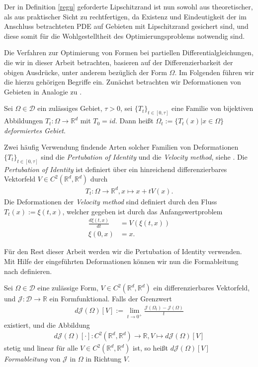 Der in Definition \ref{regu} geforderte Lipschitzrand ist nun sowohl aus theoretischer, als aus praktischer Sicht zu rechtfertigen, da Existenz und Eindeutigkeit der im Anschluss betrachteten PDE auf Gebieten mit Lipschitzrand gesichert sind, und diese somit für die Wohlgestelltheit des Optimierungsproblems notwendig sind. 

Die Verfahren zur Optimierung von Formen bei partiellen Differentialgleichungen, die wir in dieser Arbeit betrachten, basieren auf der Differenzierbarkeit der obigen Ausdrücke, unter anderem bezüglich der Form $\Omega$. Im Folgenden führen wir die hierzu gehörigen Begriffe ein. Zunächst betrachten wir Deformationen von Gebieten in Analogie zu \cite{bfgs2}.

\begin{defi}
Sei $\Omega\in\mathcal{D}$ ein zulässiges Gebiet, $\tau > 0$, sei $\{T_t\}_{t\in [0,\tau]}$ eine Familie von bijektiven Abbildungen $T_t: \Omega \rightarrow \mathbb{R}^d$ mit $T_0 = id$. Dann heißt $\Omega_t := \{T_t(x) \vert x\in\Omega\}$ \textit{deformiertes Gebiet}.
\end{defi}

Zwei häufig Verwendung findende Arten solcher Familien von Deformationen $\{T_t\}_{t\in [0,\tau]}$ sind die \textit{Pertubation of Identity} und die \textit{Velocity method}, siehe \cite{bfgs2}. Die \textit{Pertubation of Identity} ist definiert über ein hinreichend differenzierbares Vektorfeld $V \in C^2(\mathbb{R}^d,\mathbb{R}^d)$ durch
\begin{align*}
	T_t: \Omega \rightarrow \mathbb{R}^d, x \mapsto x + tV(x).
\end{align*}
Die Deformationen der \textit{Velocity method} sind definiert durch den Fluss $T_t(x) := \xi(t,x)$, welcher gegeben ist durch das Anfangswertproblem
\begin{align*}
	\frac{d\xi(t,x)}{dt} &= V(\xi(t,x))\\
	\xi(0,x) 		&= x.
\end{align*}

Für den Rest dieser Arbeit werden wir die Pertubation of Identity verwenden. Mit Hilfe der eingeführten Deformationen können wir nun die Formableitung nach \cite{bfgs2} definieren. 

\begin{defi}[Formableitung]
Sei $\Omega \in \mathcal{D}$ eine zulässige Form, $V\in C^2(\mathbb{R}^d,\mathbb{R}^d)$ ein differenzierbares Vektorfeld, und $\mathcal{J}: \mathcal{D} \rightarrow \mathbb{R}$ ein Formfunktional. Falls der Grenzwert
\begin{align*}
	d\mathcal{J}(\Omega)[V] := \underset{t \rightarrow 0^+}{\lim}
	\frac{\mathcal{J}(\Omega_t) - \mathcal{J}(\Omega)}{t}
\end{align*}
existiert, und die Abbildung 
\begin{align*}
	d\mathcal{J}(\Omega)[\cdot]: C^2(\mathbb{R}^d,\mathbb{R}^d) \rightarrow 						\mathbb{R}, V \mapsto d\mathcal{J}(\Omega)[V]
\end{align*}
stetig und linear für alle $V \in C^2(\mathbb{R}^d,\mathbb{R}^d)$ ist, so heißt $d\mathcal{J}(\Omega)[V]$ \textit{Formableitung} von $\mathcal{J}$ in $\Omega$ in Richtung $V$.
\end{defi}

